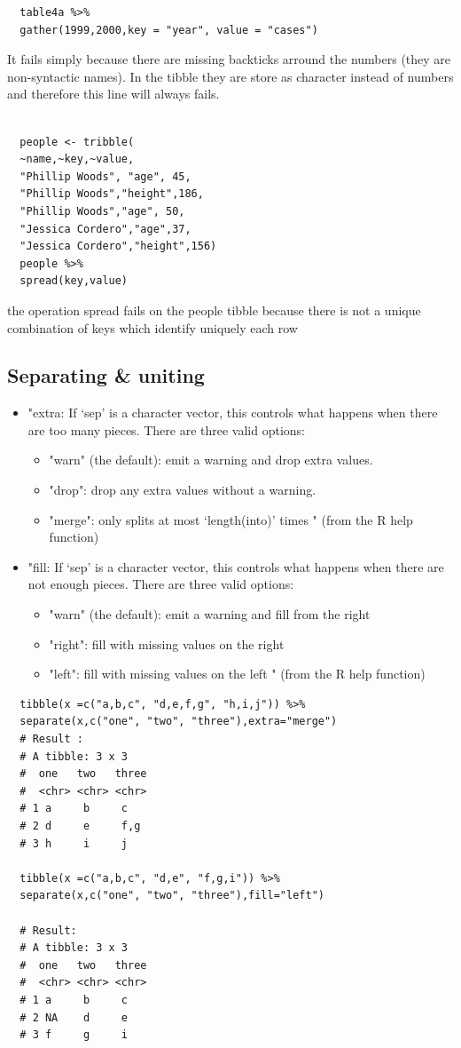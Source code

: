 \documentclass[11pt]{article}
\begin{document}
\begin{verbatim}
  table4a %>%
  gather(1999,2000,key = "year", value = "cases")
\end{verbatim}
It fails simply because there are missing backticks arround the numbers (they are non-syntactic names).
In the tibble they are store as character instead of numbers and therefore this line will always fails.
\begin{verbatim}

  people <- tribble(
  ~name,~key,~value,
  "Phillip Woods", "age", 45,
  "Phillip Woods","height",186,
  "Phillip Woods","age", 50,
  "Jessica Cordero","age",37,
  "Jessica Cordero","height",156)
  people %>%
  spread(key,value)
\end{verbatim}

the operation spread fails on the people tibble because there is not a unique combination
of keys which identify uniquely each row
\subsection{Separating \& uniting}
\label{sec:org4d5fa50}
\begin{itemize}
\item "extra: If ‘sep’ is a character vector, this controls what
  happens when there are too many pieces. There are three valid
  options:
  \begin{itemize}
  \item "warn" (the default): emit a warning and drop extra  values.
  \item "drop": drop any extra values without a warning.
  \item "merge": only splits at most ‘length(into)’ times " (from the R
    help function)
  \end{itemize}

\item "fill: If ‘sep’ is a character vector, this controls what
  happens when there are not enough pieces. There are three valid
  options:
  \begin{itemize}
  \item "warn" (the default): emit a warning and fill from the right
  \item "right": fill with missing values on the right
  \item "left": fill with missing values on the left " (from the R
    help function)
  \end{itemize}
\end{itemize}


\begin{verbatim}
  tibble(x =c("a,b,c", "d,e,f,g", "h,i,j")) %>%
  separate(x,c("one", "two", "three"),extra="merge")
  # Result :
  # A tibble: 3 x 3
  #  one   two   three
  #  <chr> <chr> <chr>
  # 1 a     b     c
  # 2 d     e     f,g
  # 3 h     i     j

  tibble(x =c("a,b,c", "d,e", "f,g,i")) %>%
  separate(x,c("one", "two", "three"),fill="left")

  # Result:
  # A tibble: 3 x 3
  #  one   two   three
  #  <chr> <chr> <chr>
  # 1 a     b     c
  # 2 NA    d     e
  # 3 f     g     i
\end{verbatim}
\end{document}
